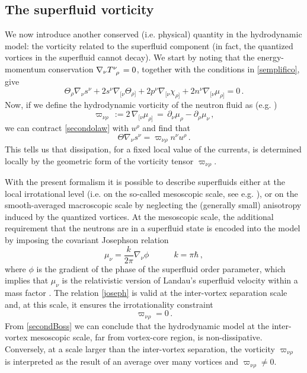 \documentclass[preprints,article,accept,moreauthors,pdftex]{mdpi}
\newcommand{\spc}{\quad \quad \quad}
\begin{document}
\subsection{The superfluid vorticity}\label{sec:vorticity}
 
We now introduce another conserved (i.e. physical) quantity in the hydrodynamic model: the vorticity related to the superfluid component (in fact, the quantized vortices in the superfluid cannot decay). We start by noting that the energy-momentum conservation $\nabla_\nu T\indices{^\nu _\rho}=0$, together with the conditions in  \eqref{semplifico}, give 
\begin{equation}\label{secondolaw}
\Theta_\rho \nabla_\nu s^\nu + 2 s^\nu \nabla_{[\nu} \Theta_{\rho]}+2 p^\nu \nabla_{[\nu} \chi_{\rho]}+2 n^\nu \nabla_{[\nu} \mu_{\rho]} =0 \, .
\end{equation}
Now, if we define the hydrodynamic vorticity of the neutron fluid as (e.g. \cite{carter92,Carter_defects2000})
\begin{equation}\label{curluzzograsso}
\varpi_{\nu \rho} \,  := 2  \, \nabla_{[ \nu} \mu_{\rho ]} 
\, = \, \partial_\nu \mu_\rho - \partial_\rho \mu_\nu  \, ,
\end{equation}
we can contract \eqref{secondolaw} with $u^\rho$ and find that
\begin{equation}
\label{secondBoss}
\Theta \nabla_\nu s^\nu = \varpi_{\nu \rho} n^\nu u^\rho \, .
\end{equation}
This tells us that dissipation, for a fixed local value of the currents, is determined locally by the geometric form of the vorticity tensor $\varpi_{\nu \rho}$.

With the present formalism it is possible to describe superfluids either at the local irrotational level (i.e. on the so-called mesoscopic scale, see e.g. \cite{Carter_defects2000}), or on the smooth-averaged macroscopic scale by neglecting the (generally small) anisotropy induced by the quantized vortices. At the mesoscopic scale, the additional requirement that the neutrons are in a superfluid state is encoded into the model by imposing the covariant Josephson relation  \citep{anderson_considerations,carter_macro_2006,Termo}
\begin{equation}
\label{joseph}
\mu_\nu = \dfrac{k}{2\pi} \nabla_\nu \phi  \spc k=\pi \hbar \,  ,
\end{equation}
where $\phi$ is the gradient of the phase of the superfluid order parameter, which implies that $\mu_\nu$ is the relativistic version of Landau's superfluid velocity within a mass factor \cite{carter92}. 
The relation \eqref{joseph} is valid at the inter-vortex separation scale and, at this scale, it ensures the irrotationality constraint
\begin{equation}
\label{zerovort}
\varpi_{\nu \rho} =0 \, .
\end{equation}
From \eqref{secondBoss} we can conclude that the hydrodynamic model at the inter-vortex mesoscopic scale, far from vortex-core region, is non-dissipative.
Conversely, at a scale larger than the inter-vortex separation, the vorticity $\varpi_{\nu \rho}$ is interpreted as the result of an average over many vortices and $\varpi_{\nu \rho} \neq 0$. 
\end{document}
